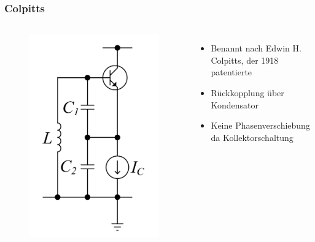 \begin{frame}
  \frametitle{Colpitts}
  \begin{columns}
    \begin{center}
      \begin{figure}
        \includegraphics[width=\textwidth,height=.7\textheight,keepaspectratio]{a07/Cc_colp2.png}
      \end{figure}
    \end{center}
    \begin{itemize}
      \item Benannt nach Edwin H. Colpitts, der 1918 patentierte
      \item Rückkopplung über Kondensator
      \item Keine Phasenverschiebung da Kollektorschaltung
    \end{itemize}
  \end{columns}
\end{frame}

